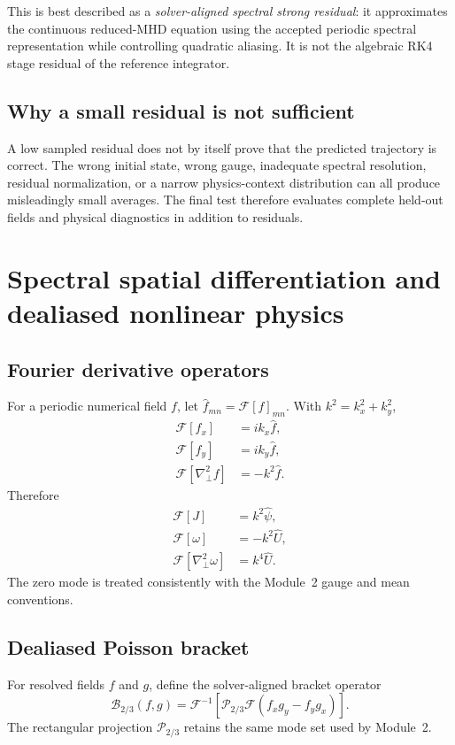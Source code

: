 \documentclass[11pt]{article}
\newcommand{\Lap}{\nabla_\perp^2}
\newcommand{\FFT}{\mathcal{F}}
\newcommand{\IFFT}{\mathcal{F}^{-1}}
\newcommand{\Ptwo}{\mathcal{P}_{2/3}}
\begin{document}
This is best described as a \emph{solver-aligned spectral strong residual}: it approximates the continuous reduced-MHD equation using the accepted periodic spectral representation while controlling quadratic aliasing. It is not the algebraic RK4 stage residual of the reference integrator.

\subsection{Why a small residual is not sufficient}
A low sampled residual does not by itself prove that the predicted trajectory is correct. The wrong initial state, wrong gauge, inadequate spectral resolution, residual normalization, or a narrow physics-context distribution can all produce misleadingly small averages. The final test therefore evaluates complete held-out fields and physical diagnostics in addition to residuals.

\section{Spectral spatial differentiation and dealiased nonlinear physics}
\label{sec:spectral}

\subsection{Fourier derivative operators}
For a periodic numerical field $f$, let $\widehat f_{mn}=\FFT[f]_{mn}$. With $k^2=k_x^2+k_y^2$,
\begin{align}
\FFT[f_x]&=ik_x\widehat f,\\
\FFT[f_y]&=ik_y\widehat f,\\
\FFT[\Lap f]&=-k^2\widehat f.
\end{align}
Therefore
\begin{align}
\FFT[J]&=k^2\widehat\psi,\\
\FFT[\omega]&=-k^2\widehat U,\\
\FFT[\Lap\omega]&=k^4\widehat U.
\end{align}
The zero mode is treated consistently with the Module~2 gauge and mean conventions.

\subsection{Dealiased Poisson bracket}
For resolved fields $f$ and $g$, define the solver-aligned bracket operator
\begin{equation}
\mathcal{B}_{2/3}(f,g)
=\IFFT\!\left[
\Ptwo\FFT\!\left(f_xg_y-f_yg_x\right)
\right].
\label{eq:dealiased_bracket}
\end{equation}
The rectangular projection $\Ptwo$ retains the same mode set used by Module~2.
\end{document}

